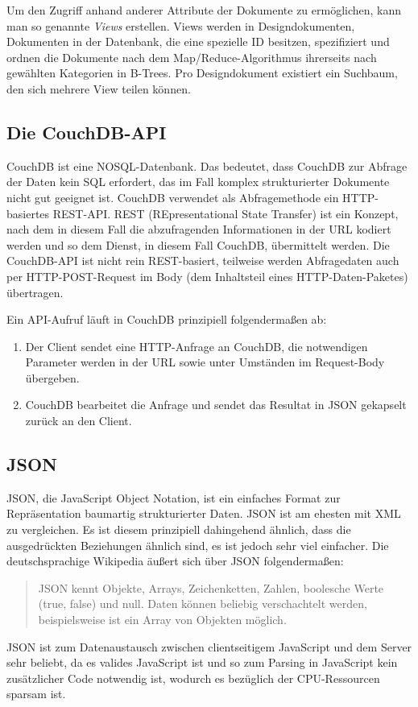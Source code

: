 \documentclass[12pt,ngerman,a4]{scrartcl}
\newcommand{\pquote}[1]{\glqq #1\grqq}
\begin{document}
Um den Zugriff anhand anderer Attribute der Dokumente zu ermöglichen, kann man so genannte \emph{Views} erstellen. Views werden in Designdokumenten, Dokumenten in der Datenbank, die eine spezielle ID besitzen, spezifiziert und ordnen die Dokumente nach dem Map/Reduce-Algorithmus %
ihrerseits nach gewählten Kategorien in B-Trees. Pro Designdokument existiert ein Suchbaum, den sich mehrere View teilen können.
\subsection{Die CouchDB-API}
CouchDB ist eine NOSQL-Datenbank. Das bedeutet, dass CouchDB zur Abfrage der Daten kein SQL erfordert, das im Fall komplex strukturierter Dokumente nicht gut geeignet ist. CouchDB verwendet als Abfragemethode ein HTTP-basiertes REST-API. REST (REpresentational State Transfer) ist ein Konzept, nach dem in diesem Fall die abzufragenden Informationen in der URL kodiert werden und so dem Dienst, in diesem Fall CouchDB, übermittelt werden. Die CouchDB-API ist nicht rein REST-basiert, teilweise werden Abfragedaten auch per HTTP-POST-Request im Body (dem Inhaltsteil eines HTTP-Daten-\pquote{Paketes}) übertragen.

Ein API-Aufruf läuft in CouchDB prinzipiell folgendermaßen ab:
\begin{enumerate}
\item Der Client sendet eine HTTP-Anfrage an CouchDB, die notwendigen Parameter werden in der URL sowie unter Umständen im Request-Body übergeben.
\item CouchDB bearbeitet die Anfrage und sendet das Resultat in JSON gekapselt zurück an den Client.
\end{enumerate}
\subsection{JSON}
JSON, die JavaScript Object Notation, ist ein einfaches Format zur Repräsentation baumartig strukturierter Daten. JSON ist am ehesten mit XML zu vergleichen. Es ist diesem prinzipiell dahingehend ähnlich, dass die ausgedrückten Beziehungen ähnlich sind, es ist jedoch sehr viel einfacher. Die deutschsprachige Wikipedia äußert sich über JSON folgendermaßen:
\begin{quote}
JSON kennt Objekte, Arrays, Zeichenketten, Zahlen, boolesche Werte (true, false) und null. Daten können beliebig verschachtelt werden, beispielsweise ist ein Array von Objekten möglich.\cite{wpjson}
\end{quote}
JSON ist zum Datenaustausch zwischen clientseitigem JavaScript und dem Server sehr beliebt, da es valides JavaScript ist und so zum Parsing in JavaScript kein zusätzlicher Code notwendig ist, wodurch es bezüglich der CPU-Ressourcen sparsam ist.
\end{document}
